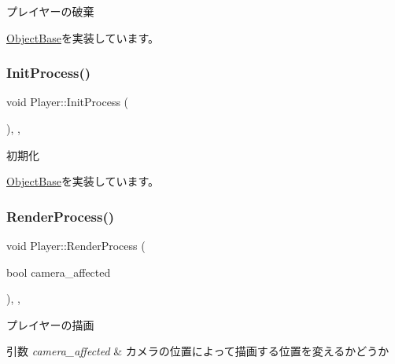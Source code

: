 プレイヤーの破棄 



\mbox{\hyperlink{class_object_base_a7fa4c548153c3af20f89673ffea809af}{Object\+Base}}を実装しています。

\mbox{\label{class_player_a1051f85c8bf18a256d275d1a1dee5da6}} 
\subsubsection{\texorpdfstring{Init\+Process()}{InitProcess()}}
{\footnotesize\ttfamily void Player\+::\+Init\+Process (\begin{DoxyParamCaption}{ }\end{DoxyParamCaption})\hspace{0.3cm}{\ttfamily [final]}, {\ttfamily [protected]}, {\ttfamily [virtual]}}



初期化 



\mbox{\hyperlink{class_object_base_af133f36f2bca1dcfd962e2cfac61ab51}{Object\+Base}}を実装しています。

\mbox{\label{class_player_a8ac2e54fe5672d32186456b9735c02c3}} 
\subsubsection{\texorpdfstring{Render\+Process()}{RenderProcess()}}
{\footnotesize\ttfamily void Player\+::\+Render\+Process (\begin{DoxyParamCaption}\item[{bool}]{camera\+\_\+affected }\end{DoxyParamCaption})\hspace{0.3cm}{\ttfamily [final]}, {\ttfamily [protected]}, {\ttfamily [virtual]}}



プレイヤーの描画 


\begin{DoxyParams}{引数}
{\em camera\+\_\+affected} & カメラの位置によって描画する位置を変えるかどうか \\
\hline
\end{DoxyParams}


